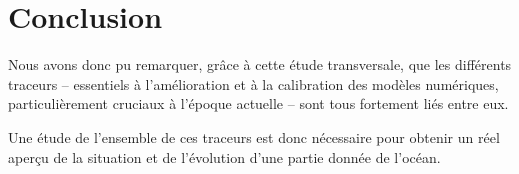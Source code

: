 \section*{Conclusion}

   Nous avons donc pu remarquer, grâce à cette étude transversale, que les différents traceurs -- essentiels à l'amélioration et à la calibration des modèles numériques, particulièrement cruciaux à l'époque actuelle -- sont tous fortement liés entre eux.

   Une étude de l'ensemble de ces traceurs est donc nécessaire pour obtenir un réel aperçu de la situation et de l'évolution d'une partie donnée de l'océan.